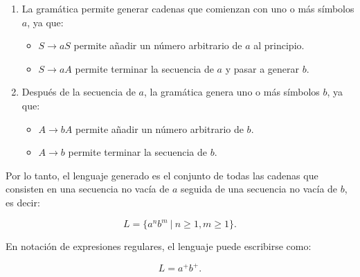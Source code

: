 \documentclass[12pt]{book} %
\begin{document}
\begin{enumerate}
\begin{solucion}[Ejercicio 2.c]
   \begin{enumerate}
       \item La gramática permite generar cadenas que comienzan con uno o más símbolos $a$, ya que:
           \begin{itemize}
               \item $S \to aS$ permite añadir un número arbitrario de $a$ al principio.
               \item $S \to aA$ permite terminar la secuencia de $a$ y pasar a generar $b$.
           \end{itemize}
       \item Después de la secuencia de $a$, la gramática genera uno o más símbolos $b$, ya que:
           \begin{itemize}
               \item $A \to bA$ permite añadir un número arbitrario de $b$.
               \item $A \to b$ permite terminar la secuencia de $b$.
           \end{itemize}
   \end{enumerate}

   Por lo tanto, el lenguaje generado es el conjunto de todas las cadenas que consisten en una secuencia no vacía de $a$ seguida de una secuencia no vacía de $b$, es decir:

   $$
   L = \{ a^n b^m \ | \ n \geq 1, m \geq 1 \}.
   $$

   En notación de expresiones regulares, el lenguaje puede escribirse como:

   $$
   L = a^+b^+.
   $$

   \end{solucion}
\end{enumerate}
\end{document}
